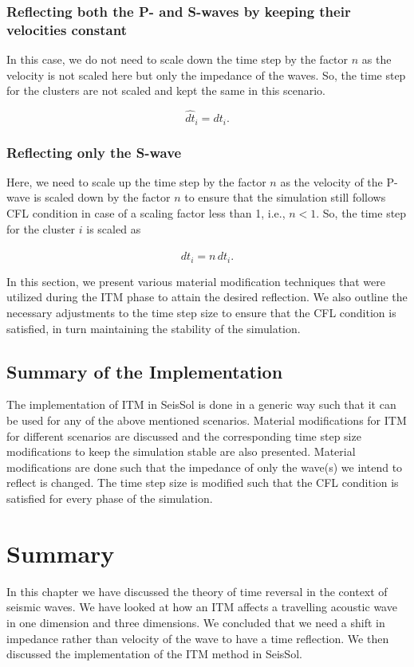 \subsubsection{Reflecting both the P- and S-waves by keeping their velocities constant}
In this case, we do not need to scale down the time step by the factor $n$ as the velocity is not scaled here but only the impedance of the waves. 
So, the time step for the clusters are not scaled and kept the same in this scenario.

\begin{equation}
    \hat{dt}_i = dt_i .
\end{equation}

\subsubsection{Reflecting only the S-wave}
Here, we need to scale up the time step by the factor $n$ as the velocity of the P- wave is scaled down by the factor $n$ to ensure that the simulation still follows
\ac{CFL} condition in case of a scaling factor less than 1, i.e., $n < 1$. So, the time step for the cluster $i$ is scaled as

\begin{equation}
    \hat{dt}_i = n \, dt_i .
\end{equation}

In this section, we present various material modification techniques that were utilized during the \ac{ITM} phase to attain the desired reflection. We also outline
the necessary adjustments to the time step size to ensure that the \ac{CFL} condition is satisfied, in turn maintaining the stability of the simulation. \\

\subsection{Summary of the Implementation}
The implementation of \ac{ITM} in SeisSol is done in a generic way such that it can be used for any of the above mentioned scenarios. 
Material modifications for \ac{ITM} for different scenarios are discussed and the corresponding time step size modifications to keep the simulation
stable are also presented. Material modifications are done such that the impedance of only the wave(s) we intend to reflect is changed. 
The time step size is modified such that the \ac{CFL} condition is satisfied for every phase of the simulation. \\


\section{Summary}
In this chapter we have discussed the theory of time reversal in the context of seismic waves. We have looked at how an \ac{ITM} affects a travelling acoustic
wave in one dimension and three dimensions. We concluded that we need a shift in impedance rather than velocity of the wave to have a time reflection. We then discussed
the implementation of the \ac{ITM} method in SeisSol.
